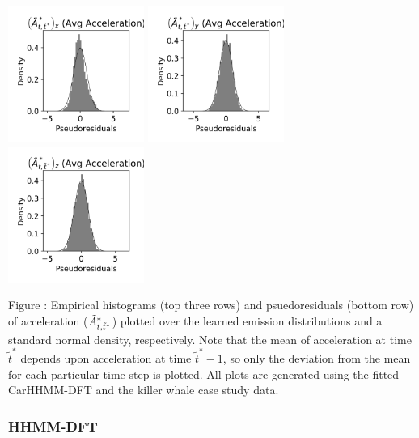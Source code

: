 \documentclass{article}
\begin{document}
\begin{center}
        \includegraphics[width=1.75in]{../Plots/CarHHMM2_psedoresids_Ax.png}
        \includegraphics[width=1.75in]{../Plots/CarHHMM2_psedoresids_Ay.png}
        \includegraphics[width=1.75in]{../Plots/CarHHMM2_psedoresids_Az.png}
        \end{center}
        
        \noindent Figure : Empirical histograms (top three rows) and psuedoresiduals (bottom row) of acceleration ($\tilde{A}^*_{t,\tilde t^*}$) plotted over the learned emission distributions and a standard normal density, respectively. Note that the mean of acceleration at time $\tilde t^*$ depends upon acceleration at time $\tilde t^*-1$, so only the deviation from the mean for each particular time step is plotted. All plots are generated using the fitted CarHHMM-DFT and the killer whale case study data.
        \addtocounter{fignum}{1}
        
        \newpage
        
        \subsubsection{HHMM-DFT}
        
\end{document}
